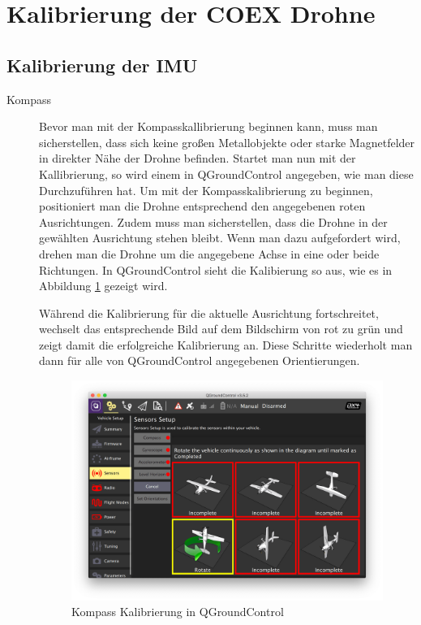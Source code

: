 \section{Kalibrierung der COEX Drohne} \label{kalibrierung_coex__drohne:subsection}
\subsection{Kalibrierung der IMU}
\begin{description}
    \item[Kompass] Bevor man mit der Kompasskallibrierung beginnen kann, muss man sicherstellen, dass sich keine großen Metallobjekte oder starke Magnetfelder in direkter Nähe der Drohne befinden. Startet man nun mit der Kallibrierung, so wird einem in QGroundControl angegeben, wie man diese Durchzuführen hat. Um mit der Kompasskalibrierung zu beginnen, positioniert man die Drohne entsprechend den angegebenen roten Ausrichtungen. Zudem muss man sicherstellen, dass die Drohne in der gewählten Ausrichtung stehen bleibt. Wenn man dazu aufgefordert wird, drehen man die Drohne um die angegebene Achse in eine oder beide Richtungen. In QGroundControl sieht die Kalibierung so aus, wie es in Abbildung \ref{fig:compass-calibration} gezeigt wird.

    Während die Kalibrierung für die aktuelle Ausrichtung fortschreitet, wechselt das entsprechende Bild auf dem Bildschirm von rot zu grün und zeigt damit die erfolgreiche Kalibrierung an. Diese Schritte wiederholt man dann für alle von QGroundControl angegebenen Orientierungen.
    \begin{figure}[H]
        \includegraphics[width=\textwidth]{./images/qgc-cal-compass.png}
        \caption{Kompass Kalibrierung in QGroundControl}\label{fig:compass-calibration}
    \end{figure}
    

\end{description}
